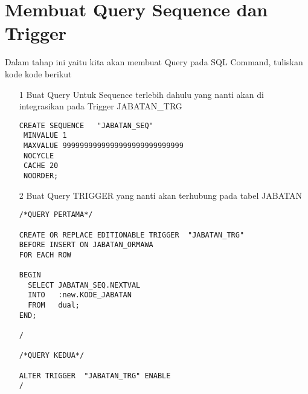 \section{Membuat Query Sequence dan Trigger}
Dalam tahap ini yaitu kita akan membuat Query pada SQL Command, tuliskan kode kode berikut

\begin{itemize}
    \item[1] Buat Query Untuk Sequence terlebih dahulu yang nanti akan di integrasikan pada Trigger JABATAN\_TRG
    \begin{lstlisting}
CREATE SEQUENCE   "JABATAN_SEQ"  
 MINVALUE 1 
 MAXVALUE 9999999999999999999999999999 
 NOCYCLE
 CACHE 20
 NOORDER;
    \end{lstlisting}
    \item[2] Buat Query TRIGGER yang nanti akan terhubung pada tabel JABATAN
    \begin{lstlisting}
/*QUERY PERTAMA*/

CREATE OR REPLACE EDITIONABLE TRIGGER  "JABATAN_TRG" 
BEFORE INSERT ON JABATAN_ORMAWA 
FOR EACH ROW

BEGIN
  SELECT JABATAN_SEQ.NEXTVAL
  INTO   :new.KODE_JABATAN
  FROM   dual;
END;

/

/*QUERY KEDUA*/

ALTER TRIGGER  "JABATAN_TRG" ENABLE
/
    \end{lstlisting}
 \end{itemize}
